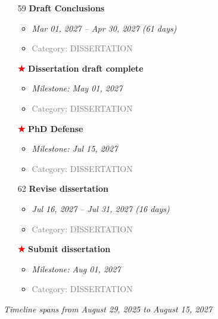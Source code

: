 \documentclass[portrait,a4paper]{article}
\begin{document}
\begin{enumerate}[leftmargin=0pt, itemindent=0pt, labelsep=0pt, labelwidth=0pt]
\item[59] \textbf{Draft Conclusions}
    \begin{itemize}
        \item \textit{Mar 01, 2027 -- Apr 30, 2027 (61 days)}
        \item \textcolor{gray}{Category: DISSERTATION}
    \end{itemize}
\vspace{0.3cm}
\item[\textcolor{red}{\textbf{★}}] \textbf{Dissertation draft complete}
    \begin{itemize}
        \item \textit{Milestone: May 01, 2027}
        \item \textcolor{gray}{Category: DISSERTATION}
    \end{itemize}
\vspace{0.3cm}
\item[\textcolor{red}{\textbf{★}}] \textbf{PhD Defense}
    \begin{itemize}
        \item \textit{Milestone: Jul 15, 2027}
        \item \textcolor{gray}{Category: DISSERTATION}
    \end{itemize}
\vspace{0.3cm}
\item[62] \textbf{Revise dissertation}
    \begin{itemize}
        \item \textit{Jul 16, 2027 -- Jul 31, 2027 (16 days)}
        \item \textcolor{gray}{Category: DISSERTATION}
    \end{itemize}
\vspace{0.3cm}
\item[\textcolor{red}{\textbf{★}}] \textbf{Submit dissertation}
    \begin{itemize}
        \item \textit{Milestone: Aug 01, 2027}
        \item \textcolor{gray}{Category: DISSERTATION}
    \end{itemize}
\vspace{0.3cm}

\end{enumerate}

\vspace{1cm}
\begin{center}
\textit{Timeline spans from August 29, 2025 to August 15, 2027}
\end{center}
\end{document}
